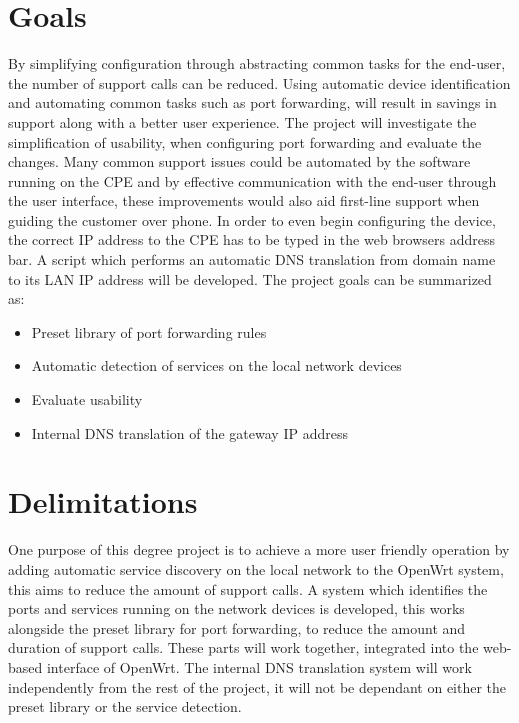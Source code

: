 \documentclass[a4paper,11pt,makeidx]{kth-bcs}
\begin{document}
\section{Goals}
By simplifying configuration through abstracting common tasks for the end-user, the number of support calls can be reduced.
Using automatic device identification and automating common tasks such as port forwarding, will result in savings in support along with a better user experience.
The project will investigate the simplification of usability, when configuring port forwarding and evaluate the changes.
Many common support issues could be automated by the software running on the CPE and by effective communication with the end-user through the user interface, these improvements would also aid first-line support when guiding the customer over phone.
In order to even begin configuring the device, the correct IP address to the CPE has to be typed in the web browsers address bar.
A script which performs an automatic DNS translation from domain name to its LAN IP address will be developed.
The project goals can be summarized as:

\begin{itemize}
   \item Preset library of port forwarding rules
   \item Automatic detection of services on the local network devices
   \item Evaluate usability
   \item Internal DNS translation of the gateway IP address
\end{itemize}

\section{Delimitations}
One purpose of this degree project is to achieve a more user friendly operation by adding automatic service discovery on the local network to the OpenWrt system, this aims to reduce the amount of support calls.
A system which identifies the ports and services running on the network devices is developed, this works alongside the preset library for port forwarding, to reduce the amount and duration of support calls.
These parts will work together, integrated into the web-based interface of OpenWrt.
The internal DNS translation system will work independently from the rest of the project, it will not be dependant on either the preset library or the service detection.
\end{document}
